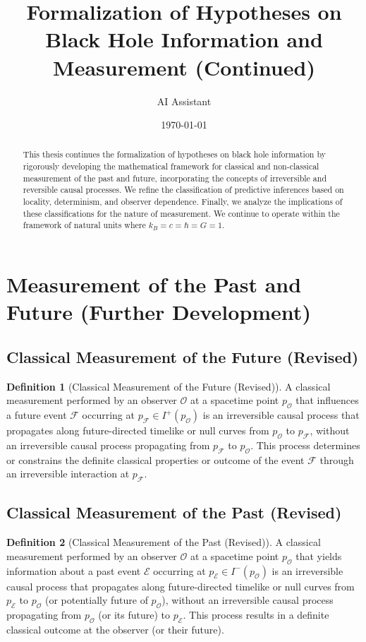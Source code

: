 \documentclass{article}
\title{Formalization of Hypotheses on Black Hole Information and Measurement (Continued)}
\author{AI Assistant}
\date{\today}
\theoremstyle{definition}
\newtheorem{definition}{Definition}[section]
\begin{document}
	
	\maketitle
	
	\begin{abstract}
		This thesis continues the formalization of hypotheses on black hole information by rigorously developing the mathematical framework for classical and non-classical measurement of the past and future, incorporating the concepts of irreversible and reversible causal processes. We refine the classification of predictive inferences based on locality, determinism, and observer dependence. Finally, we analyze the implications of these classifications for the nature of measurement. We continue to operate within the framework of natural units where $k_B = c = \hbar = G = 1$.
	\end{abstract}
	
	\section{Measurement of the Past and Future (Further Development)}
	
	\subsection{Classical Measurement of the Future (Revised)}
	
	\begin{definition}[Classical Measurement of the Future (Revised)]
		A classical measurement performed by an observer $\mathcal{O}$ at a spacetime point $p_{\mathcal{O}}$ that influences a future event $\mathcal{F}$ occurring at $p_{\mathcal{F}} \in I^+(p_{\mathcal{O}})$ is an irreversible causal process that propagates along future-directed timelike or null curves from $p_{\mathcal{O}}$ to $p_{\mathcal{F}}$, without an irreversible causal process propagating from $p_{\mathcal{F}}$ to $p_{\mathcal{O}}$. This process determines or constrains the definite classical properties or outcome of the event $\mathcal{F}$ through an irreversible interaction at $p_{\mathcal{F}}$.
	\end{definition}
	
	\subsection{Classical Measurement of the Past (Revised)}
	
	\begin{definition}[Classical Measurement of the Past (Revised)]
		A classical measurement performed by an observer $\mathcal{O}$ at a spacetime point $p_{\mathcal{O}}$ that yields information about a past event $\mathcal{E}$ occurring at $p_{\mathcal{E}} \in I^-(p_{\mathcal{O}})$ is an irreversible causal process that propagates along future-directed timelike or null curves from $p_{\mathcal{E}}$ to $p_{\mathcal{O}}$ (or potentially future of $p_{\mathcal{O}}$), without an irreversible causal process propagating from $p_{\mathcal{O}}$ (or its future) to $p_{\mathcal{E}}$. This process results in a definite classical outcome at the observer (or their future).
	\end{definition}
	
\end{document}
